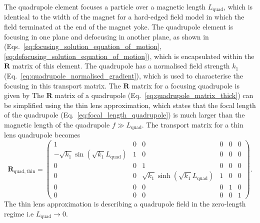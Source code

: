 \documentclass[../main.tex]{subfiles}
\begin{document}
The quadrupole element focuses a particle over a magnetic length $L_{\mathrm{quad}}$, which is identical to the width of the magnet for a hard-edged field model in which the field terminated at the end of the magnet yoke. The quadrupole element is focusing in one plane and defocusing in another plane, as shown in (Eqs.~\ref{eq:focusing_solution_equation_of_motion}, \ref{eq:defocusing_solution_equation_of_motion}), which is encapsulated within the $\boldsymbol{R}$ matrix of this element. The quadrupole has a normalised field strength $k_{1}$ (Eq.~\ref{eq:quadrupole_normalised_gradient}), which is used to characterise the focusing in this transport matrix. The $\boldsymbol{R}$ matrix for a focusing quadrupole is given by
The $\boldsymbol{R}$ matrix of a quadrupole (Eq.~\ref{eq:quadrupole_matrix_thick}) can be simplified using the thin lens approximation, which states that the focal length of the quadrupole (Eq.~\ref{eq:focal_length_quadrupole}) is much larger than the magnetic length of the quadrupole $f \gg L_{\mathrm{quad}}$. The transport matrix for a thin lens quadrupole becomes
\begin{equation}
\boldsymbol{R}_{\mathrm{quad, thin}} = 
\begin{pmatrix}
1 & 0 & 0 & 0 & 0 & 0 \\
-\sqrt{k_{1}}\sin\left(\sqrt{k_{1}}L_{\mathrm{quad}}\right) & 1 & 0 & 0 & 0 & 0 \\
0 & 0 & 1 & 0 & 0 & 0 \\
0 & 0 &  \sqrt{k_{1}}\sinh\left(\sqrt{k_{1}}L_{\mathrm{quad}}\right) & 1 & 0 & 0 \\
0 & 0 & 0 & 0 & 1 & 0 \\
0 & 0 & 0 & 0 & 0 & 1 
\end{pmatrix}.
\label{eq:quadrupole_matrix_thin}    
\end{equation}
The thin lens approximation is describing a quadrupole field in the zero-length regime i.e $L_{\mathrm{quad}}\rightarrow 0$\cite{rossbach1993basic}.
\end{document}
